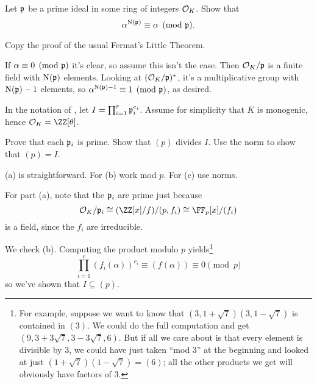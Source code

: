 \begin{problem}
	Let $\mathfrak p$ be a prime ideal in some ring of integers $\mathcal O_K$.
	Show that \[ \alpha^{\operatorname{N}(\mathfrak p)} \equiv \alpha \pmod{\mathfrak p}. \]
	\begin{hint}
		Copy the proof of the usual Fermat's Little Theorem.
	\end{hint}
	\begin{sol}
		If $\alpha \equiv 0 \pmod{\mathfrak p}$ it's clear, so assume this isn't the case.
		Then $\mathcal O_K/\mathfrak p$ is a finite field with $\operatorname{N}(\mathfrak p)$ elements.
		Looking at $(\mathcal O_K/\mathfrak p)^\ast$, it's a multiplicative group with $\operatorname{N}(\mathfrak p)-1$ elements,
		so $\alpha^{\operatorname{N}(\mathfrak p)-1} \equiv 1 \pmod{\mathfrak p}$, as desired.
	\end{sol}
\end{problem}

\begin{problem}
	\label{prob:prove_factoring_algorithm}
	In the notation of , let $I = \prod_{i=1}^r \mathfrak p_i^{e_i}$.
	Assume for simplicity that $K$ is monogenic, hence $\OO_K = \ZZ[\theta]$.
	\begin{enumerate}[(a)]
		\ii Prove that each $\mathfrak p_i$ is prime.
		\ii Show that $(p)$ divides $I$.
		\ii Use the norm to show that $(p) = I$.
	\end{enumerate}
	\begin{hint}
		(a) is straightforward.
		For (b) work mod $p$.
		For (c) use norms.
	\end{hint}
	\begin{sol}
	For part (a), note that the $\mathfrak p_i$ are prime
	just because 
	\[ \OO_K / \pp_i
		\cong (\ZZ[x] / f) / (p, f_i)
		\cong \FF_p[x] / (f_i) \]
	is a field, since the $f_i$ are irreducible.

	We check (b).
		Computing the product modulo $p$ yields\footnote{%
			For example, suppose we want to know that $(3, 1+\sqrt{7})(3, 1-\sqrt{7})$ is contained in $(3)$.
			We could do the full computation and get $(9, 3+3\sqrt{7}, 3-3\sqrt{7}, 6)$.
			But if all we care about is that every element is divisible by $3$, we could have just taken ``mod $3$''
			at the beginning and looked at just $(1+\sqrt{7})(1-\sqrt{7}) = (6)$;
			all the other products we get will obviously have factors of $3$.
		}
		\[ \prod_{i=1}^{r} (f_i(\alpha))^{e_i}
			\equiv (f(\alpha)) \equiv 0 \pmod p \]
		so we've shown that $I \subseteq (p)$.


\end{sol}
\end{problem}
